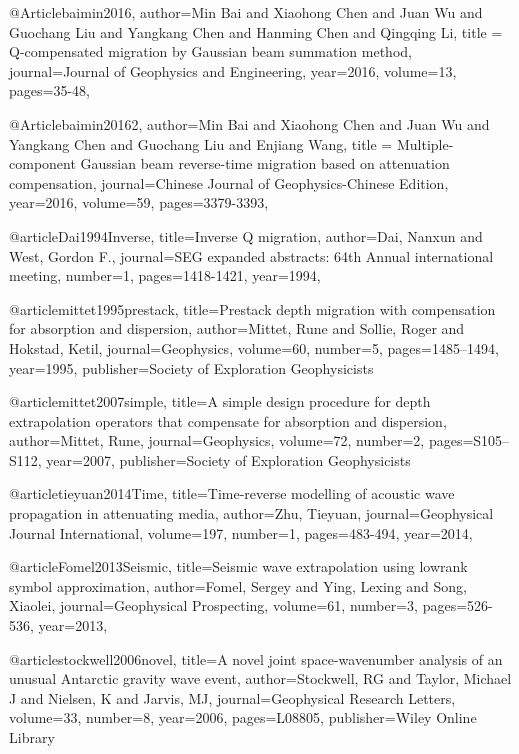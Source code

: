 {@Article{baimin2016,
  author={Min Bai and Xiaohong Chen and Juan Wu and Guochang Liu and Yangkang Chen and Hanming Chen and Qingqing Li},
  title = {Q-compensated migration by Gaussian beam summation method},
  journal={Journal of Geophysics and Engineering},
  year=2016,
  volume=13,
  pages={35-48},
}

@Article{baimin20162,
  author={Min Bai and Xiaohong Chen and Juan Wu and Yangkang Chen and Guochang Liu and  Enjiang Wang},
  title = {Multiple-component Gaussian beam reverse-time migration based on attenuation compensation},
  journal={Chinese Journal of Geophysics-Chinese Edition},
  year=2016,
  volume=59,
  pages={3379-3393},
}

@article{Dai1994Inverse,
  title={Inverse {Q} migration},
  author={Dai, Nanxun and West, Gordon F.},
  journal={SEG expanded abstracts: 64th Annual international meeting},
  number={1},
  pages={1418-1421},
  year={1994},
}

@article{mittet1995prestack,
  title={Prestack depth migration with compensation for absorption and dispersion},
  author={Mittet, Rune and Sollie, Roger and Hokstad, Ketil},
  journal={Geophysics},
  volume={60},
  number={5},
  pages={1485--1494},
  year={1995},
  publisher={Society of Exploration Geophysicists}
}

@article{mittet2007simple,
  title={A simple design procedure for depth extrapolation operators that compensate for absorption and dispersion},
  author={Mittet, Rune},
  journal={Geophysics},
  volume={72},
  number={2},
  pages={S105--S112},
  year={2007},
  publisher={Society of Exploration Geophysicists}
}

@article{tieyuan2014Time,
  title={Time-reverse modelling of acoustic wave propagation in attenuating media},
  author={Zhu, Tieyuan},
  journal={Geophysical Journal International},
  volume={197},
  number={1},
  pages={483-494},
  year={2014},
}

@article{Fomel2013Seismic,
  title={Seismic wave extrapolation using lowrank symbol approximation},
  author={Fomel, Sergey and Ying, Lexing and Song, Xiaolei},
  journal={Geophysical Prospecting},
  volume={61},
  number={3},
  pages={526-536},
  year={2013},
}

@article{stockwell2006novel,
  title={A novel joint space-wavenumber analysis of an unusual Antarctic gravity wave event},
  author={Stockwell, RG and Taylor, Michael J and Nielsen, K and Jarvis, MJ},
  journal={Geophysical Research Letters},
  volume={33},
  number={8},
  year={2006},
  pages={L08805},
  publisher={Wiley Online Library}
}

}
